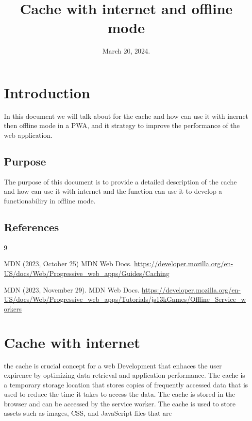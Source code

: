 \documentclass[12pt,a4paper, twosite]{article}
\date{March 20, 2024.}
\title{Cache with internet and offline mode}
\begin{document}
\maketitle

\newpage
\tableofcontents

\newpage

\section{Introduction}
\label{sec:org60390fa}

In this document we will talk about for the cache and how can use it with inernet then offline mode in a PWA, and it strategy to improve the performance of the web application.

\subsection{Purpose}
\label{sec:org434c3ef}

The purpose of this document is to provide a detailed description of the cache and how can use it with internet and the function can use it to develop a functionabiliry in offline mode.

\subsection{References}
\label{sec:org62711e0}

\begin{thebibliography}
{9}

 MDN (2023, October 25) MDN Web Docs.  \url{https://developer.mozilla.org/en-US/docs/Web/Progressive_web_apps/Guides/Caching}

 MDN (2023, November 29). MDN Web Docs.  \url{https://developer.mozilla.org/en-US/docs/Web/Progressive_web_apps/Tutorials/js13kGames/Offline_Service_workers}


\end{thebibliography}


\section{Cache with internet}
\label{sec:orgc1c4017}
the cache is crucial concept for a web Development that enhaces the user expirence by optimizing data retrieval and application performance. The cache is a temporary storage location that stores copies of frequently accessed data that is used to reduce the time it takes to access the data. The cache is stored in the browser and can be accessed by the service worker. The cache is used to store assets such as images, CSS, and JavaScript files that are
\end{document}
